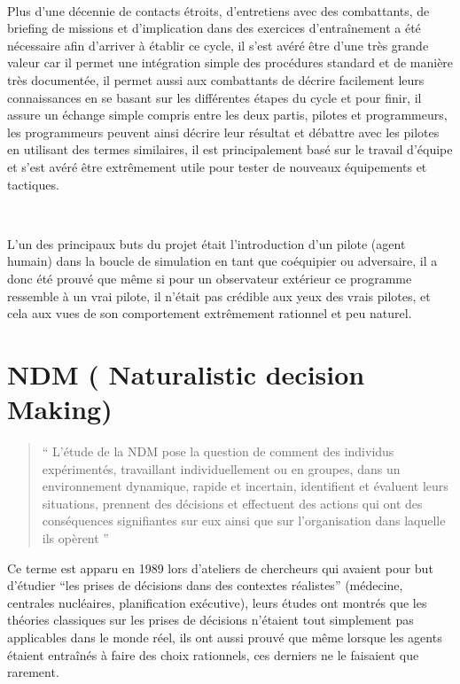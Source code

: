 ~\par
Plus d'une décennie de contacts étroits, d'entretiens avec des combattants, de briefing de missions et d'implication dans des exercices d'entraînement a été nécessaire afin d’arriver à établir ce cycle, il s’est avéré être d’une très grande valeur car il permet une intégration simple des procédures standard et de manière très documentée, il permet aussi aux combattants de décrire facilement leurs connaissances en se basant sur les différentes étapes du cycle et pour finir, il assure un échange simple compris entre les deux partis, pilotes et programmeurs, les programmeurs peuvent ainsi décrire leur résultat et débattre avec les pilotes en utilisant des termes similaires, il est principalement  basé sur le travail d’équipe et s’est avéré être extrêmement utile pour tester de nouveaux équipements et tactiques.

~\par
L’un des principaux buts du projet était  l’introduction d’un pilote (agent humain) dans la boucle de simulation en tant que coéquipier ou adversaire, il a donc été prouvé que même si pour un observateur extérieur ce programme ressemble à un vrai pilote, il n’était pas crédible aux yeux des vrais pilotes, et cela aux vues de son comportement extrêmement rationnel et peu naturel. \parencite{norling2000enhancing}


\section{NDM ( Naturalistic decision Making)}

\begin{quotation}
“ L’étude de la NDM  pose la question de comment des individus expérimentés, travaillant individuellement ou en groupes, dans un environnement dynamique, rapide et incertain, identifient et évaluent leurs situations, prennent des décisions et effectuent des actions qui ont des conséquences signifiantes sur eux ainsi que sur l'organisation dans laquelle ils opèrent ” \parencite{zsambok2014naturalistic} \end{quotation} 



Ce terme est apparu en 1989 lors d’ateliers de chercheurs qui avaient pour but d’étudier 
“les prises de décisions dans des contextes réalistes” (médecine, centrales nucléaires, planification exécutive), leurs études ont montrés que les théories classiques sur les prises de décisions n’étaient tout simplement pas applicables dans le monde réel, ils ont aussi prouvé que même lorsque les agents étaient entraînés à faire des choix rationnels, ces derniers ne le faisaient que rarement.

